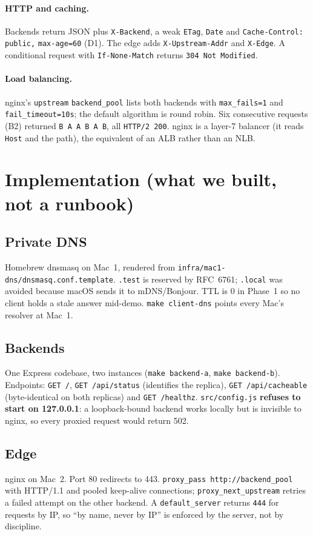 \documentclass[11pt,a4paper]{article}
\begin{document}
\paragraph{HTTP and caching.}
Backends return JSON plus \texttt{X-Backend}, a weak \texttt{ETag}, \texttt{Date} and
\texttt{Cache-Control:} \texttt{public,} \texttt{max-age=60} (D1). The edge adds \texttt{X-Upstream-Addr} and \texttt{X-Edge}.
A conditional request with \texttt{If-None-Match} returns \texttt{304 Not Modified}.

\paragraph{Load balancing.}
nginx's \texttt{upstream} \texttt{backend\_pool} lists both backends with
\texttt{max\_fails=1} and \texttt{fail\_timeout=10s}; the default algorithm is round robin. Six consecutive requests (B2) returned \texttt{B A A B A B},
all \texttt{HTTP/2 200}. nginx is a layer-7 balancer (it reads \texttt{Host} and the path), the
equivalent of an ALB rather than an NLB.

\section{Implementation (what we built, not a runbook)}

\subsection{Private DNS}
Homebrew dnsmasq on Mac~1, rendered from \texttt{infra/mac1-dns/dnsmasq.conf.template}.
\texttt{.test} is reserved by RFC~6761; \texttt{.local} was avoided because macOS sends it to
mDNS/Bonjour. TTL is 0 in Phase~1 so no client holds a stale answer mid-demo.
\texttt{make client-dns} points every Mac's resolver at Mac~1.

\subsection{Backends}
One Express codebase, two instances (\texttt{make backend-a}, \texttt{make backend-b}). Endpoints:
\texttt{GET /}, \texttt{GET /api/status} (identifies the replica), \texttt{GET /api/cacheable}
(byte-identical on both replicas) and \texttt{GET /healthz}. \texttt{src/config.js}
\textbf{refuses to start on 127.0.0.1}: a loopback-bound backend works locally but is invisible
to nginx, so every proxied request would return 502.

\subsection{Edge}
nginx on Mac~2. Port 80 redirects to 443. \texttt{proxy\_pass http://backend\_pool} with
HTTP/1.1 and pooled keep-alive connections; \texttt{proxy\_next\_upstream} retries a failed
attempt on the other backend. A \texttt{default\_server} returns \texttt{444} for requests by IP,
so ``by name, never by IP'' is enforced by the server, not by discipline.
\end{document}

